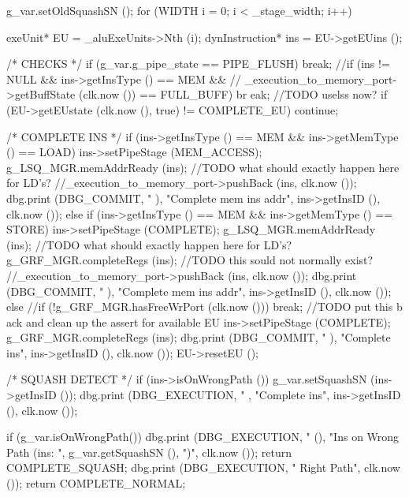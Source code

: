 \begin{DoxyCode}
                                                        {
    g_var.setOldSquashSN ();
    for (WIDTH i = 0; i < _stage_width; i++) {
        exeUnit* EU = _aluExeUnits->Nth (i);
        dynInstruction* ins = EU->getEUins ();

        /* CHECKS */
        if (g_var.g_pipe_state == PIPE_FLUSH) break;
      //if (ins != NULL && ins->getInsType () == MEM && 
      //    _execution_to_memory_port->getBuffState (clk.now ()) == FULL_BUFF) br
      eak; //TODO uselss now?
        if (EU->getEUstate (clk.now (), true) != COMPLETE_EU) continue;

        /* COMPLETE INS */
        if (ins->getInsType () == MEM && ins->getMemType () == LOAD) {
            ins->setPipeStage (MEM_ACCESS);
            g_LSQ_MGR.memAddrReady (ins); //TODO what should exactly happen here 
      for LD's?
            //_execution_to_memory_port->pushBack (ins, clk.now ());
            dbg.print (DBG_COMMIT, "%
      ), "Complete mem ins addr", ins->getInsID (), clk.now ());
        } else if (ins->getInsType () == MEM && ins->getMemType () == STORE) {
            ins->setPipeStage (COMPLETE);
            g_LSQ_MGR.memAddrReady (ins); //TODO what should exactly happen here 
      for LD's?
            g_GRF_MGR.completeRegs (ins); //TODO this sould not normally exist?
            //_execution_to_memory_port->pushBack (ins, clk.now ());
            dbg.print (DBG_COMMIT, "%
      ), "Complete mem ins addr", ins->getInsID (), clk.now ());
        } else {
            //if (!g_GRF_MGR.hasFreeWrPort (clk.now ())) break; //TODO put this b
      ack and clean up the assert for available EU
            ins->setPipeStage (COMPLETE);
            g_GRF_MGR.completeRegs (ins);
            dbg.print (DBG_COMMIT, "%
      ), "Complete ins", ins->getInsID (), clk.now ());
        }
        EU->resetEU ();

        /* SQUASH DETECT */
        if (ins->isOnWrongPath ()) {
            g_var.setSquashSN (ins->getInsID ());
        }
        dbg.print (DBG_EXECUTION, "%
      , "Complete ins", ins->getInsID (), clk.now ());
    }

    if (g_var.isOnWrongPath()) {
        dbg.print (DBG_EXECUTION, "%
       (), "Ins on Wrong Path (ins: ", g_var.getSquashSN (), ")", clk.now ());
        return COMPLETE_SQUASH;
    }
    dbg.print (DBG_EXECUTION, "%
       Right Path", clk.now ());
    return COMPLETE_NORMAL;
}
\end{DoxyCode}
